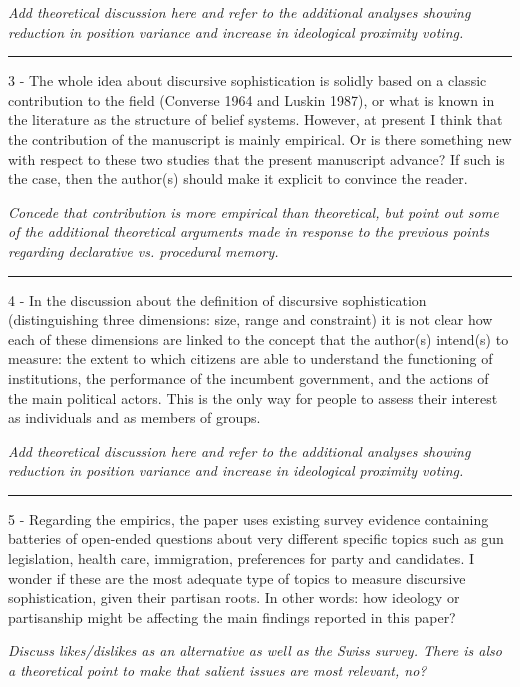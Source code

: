 \textit{Add theoretical discussion here and refer to the additional analyses showing reduction in position variance and increase in ideological proximity voting.}

\rule{\linewidth}{.01cm}

3 - The whole idea about discursive sophistication is solidly based on a classic contribution to the field (Converse 1964 and Luskin 1987), or what is known in the literature as the structure of belief systems. However, at present I think that the contribution of the manuscript is mainly empirical. Or is there something new with respect to these two studies that the present manuscript advance? If such is the case, then the author(s) should make it explicit to convince the reader.

\textit{Concede that contribution is more empirical than theoretical, but point out some of the additional theoretical arguments made in response to the previous points regarding declarative vs. procedural memory.}

\rule{\linewidth}{.01cm}

4 - In the discussion about the definition of discursive sophistication (distinguishing three dimensions: size, range and constraint) it is not clear how each of these dimensions are linked to the concept that the author(s) intend(s) to measure: the extent to which citizens are able to understand the functioning of institutions, the performance of the incumbent government, and the actions of the main political actors. This is the only way for people to assess their interest as individuals and as members of groups.

\textit{Add theoretical discussion here and refer to the additional analyses showing reduction in position variance and increase in ideological proximity voting.}

\rule{\linewidth}{.01cm}

5 - Regarding the empirics, the paper uses existing survey evidence containing batteries of open-ended questions about very different specific topics such as gun legislation, health care, immigration, preferences for party and candidates. I wonder if these are the most adequate type of topics to measure discursive sophistication, given their partisan roots. In other words: how ideology or partisanship might be affecting the main findings reported in this paper?

\textit{Discuss likes/dislikes as an alternative as well as the Swiss survey. There is also a theoretical point to make that salient issues are most relevant, no?}

